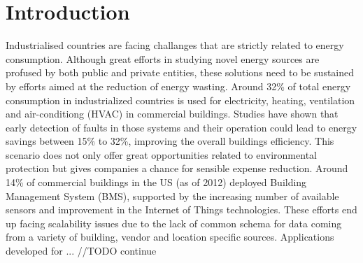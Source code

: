 \chapter*{Introduction}
\label{ch:introduction}
Industrialised countries are facing challanges that are strictly related to energy consumption. Although great efforts in studying novel energy sources are profused by both public and private entities, these solutions need to be sustained by efforts aimed at the reduction of energy wasting. Around 32\% of total energy consumption in industrialized countries is used for electricity, heating, ventilation and air-conditiong (HVAC) in commercial buildings. Studies have shown that early detection of faults in those systems and their operation could lead to energy savings between 15\% to 32\%, improving the overall buildings efficiency. This scenario does not only offer great opportunities related to environmental protection but gives companies a chance for sensible expense reduction. Around 14\% of commercial buildings in the US (as of 2012) deployed Building Management System (BMS), supported by the increasing number of available sensors and improvement in the Internet of Things technologies. These efforts end up facing scalability issues due to the lack of common schema for data coming from a variety of building, vendor and location specific sources. Applications developed for ... //TODO continue
